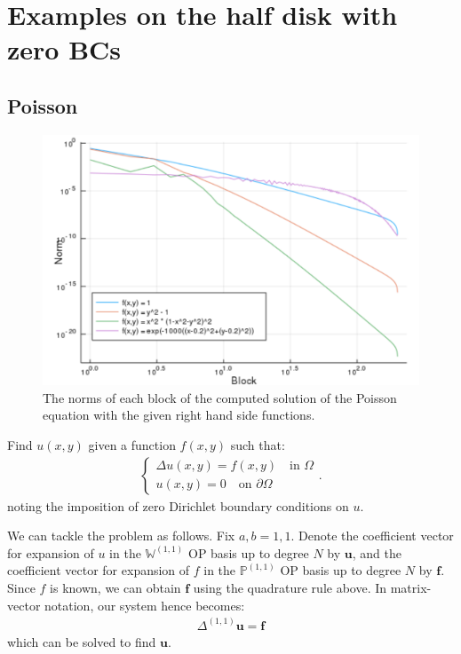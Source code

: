 \documentclass[11pt, oneside]{article}   	%
\newcommand{\bigPii}{{\mathbb{P}^{(1,1)}}}
\newcommand{\bigWii}{{\mathbb{W}^{(1,1)}}}
\begin{document}
%
\section{Examples on the half disk with zero BCs}\label{Section:Examples}


\subsection{Poisson}

\begin{figure}
	\centering
	\includegraphics[scale=0.4]{solutionblocknorms}
	\caption{The norms of each block of the computed solution of the Poisson equation with the given right hand side functions.}
	\centering
	\label{fig:solutionblocknorms}
\end{figure}

Find \(u(x,y)\) given a function \(f(x,y)\) such that:
\begin{align}
	\begin{cases}
    		\Delta u(x,y) = f(x,y) \quad \text{in } \Omega \\
		u(x,y) = 0 \quad \text{on } \partial \Omega
	\end{cases}.
\end{align}
noting the imposition of zero Dirichlet boundary conditions on $u$.

We can tackle the problem as follows. Fix \(a, b = 1,1\). Denote the coefficient vector for expansion of $u$ in the $\bigWii$ OP basis up to degree $N$ by $\mathbf{u}$, and the coefficient vector for expansion of $f$ in the $\bigPii$ OP basis up to degree $N$ by $\mathbf{f}$. Since $f$ is known, we can obtain $\mathbf{f}$ using the quadrature rule above. In matrix-vector notation, our system hence becomes:
\begin{align}
    \Delta^{(1,1)} \mathbf{u} = \mathbf{f}
\end{align}
which can be solved to find $\mathbf{u}$.
\end{document}
